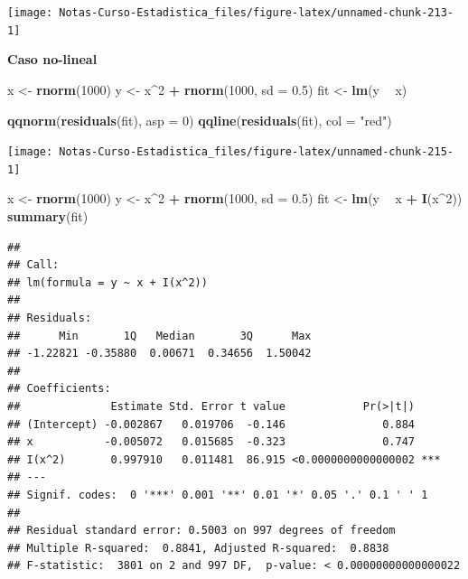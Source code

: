 \documentclass[
  12pt,
]{book}
\newenvironment{Shaded}{\begin{snugshade}}{\end{snugshade}}
\newcommand{\DataTypeTok}[1]{\textcolor[rgb]{0.13,0.29,0.53}{#1}}
\newcommand{\DecValTok}[1]{\textcolor[rgb]{0.00,0.00,0.81}{#1}}
\newcommand{\FloatTok}[1]{\textcolor[rgb]{0.00,0.00,0.81}{#1}}
\newcommand{\KeywordTok}[1]{\textcolor[rgb]{0.13,0.29,0.53}{\textbf{#1}}}
\newcommand{\NormalTok}[1]{#1}
\newcommand{\OperatorTok}[1]{\textcolor[rgb]{0.81,0.36,0.00}{\textbf{#1}}}
\newcommand{\StringTok}[1]{\textcolor[rgb]{0.31,0.60,0.02}{#1}}
\theoremstyle{definition}
\theoremstyle{definition}
\theoremstyle{definition}
\theoremstyle{remark}
\begin{document}
\begin{center}\texttt{[image: Notas-Curso-Estadistica\_files/figure-latex/unnamed-chunk-213-1]} \end{center}

\textbf{Caso no-lineal}

\begin{Shaded}
\begin{Highlighting}[]
\NormalTok{x <-}\StringTok{ }\KeywordTok{rnorm}\NormalTok{(}\DecValTok{1000}\NormalTok{)}
\NormalTok{y <-}\StringTok{ }\NormalTok{x}\OperatorTok{^}\DecValTok{2} \OperatorTok{+}\StringTok{ }\KeywordTok{rnorm}\NormalTok{(}\DecValTok{1000}\NormalTok{, }\DataTypeTok{sd =} \FloatTok{0.5}\NormalTok{)}
\NormalTok{fit <-}\StringTok{ }\KeywordTok{lm}\NormalTok{(y }\OperatorTok{~}\StringTok{ }\NormalTok{x)}
\end{Highlighting}
\end{Shaded}

\begin{Shaded}
\begin{Highlighting}[]
\KeywordTok{qqnorm}\NormalTok{(}\KeywordTok{residuals}\NormalTok{(fit), }\DataTypeTok{asp =} \DecValTok{0}\NormalTok{)}
\KeywordTok{qqline}\NormalTok{(}\KeywordTok{residuals}\NormalTok{(fit), }\DataTypeTok{col =} \StringTok{"red"}\NormalTok{)}
\end{Highlighting}
\end{Shaded}

\begin{center}\texttt{[image: Notas-Curso-Estadistica\_files/figure-latex/unnamed-chunk-215-1]} \end{center}

\begin{Shaded}
\begin{Highlighting}[]
\NormalTok{x <-}\StringTok{ }\KeywordTok{rnorm}\NormalTok{(}\DecValTok{1000}\NormalTok{)}
\NormalTok{y <-}\StringTok{ }\NormalTok{x}\OperatorTok{^}\DecValTok{2} \OperatorTok{+}\StringTok{ }\KeywordTok{rnorm}\NormalTok{(}\DecValTok{1000}\NormalTok{, }\DataTypeTok{sd =} \FloatTok{0.5}\NormalTok{)}
\NormalTok{fit <-}\StringTok{ }\KeywordTok{lm}\NormalTok{(y }\OperatorTok{~}\StringTok{ }\NormalTok{x }\OperatorTok{+}\StringTok{ }\KeywordTok{I}\NormalTok{(x}\OperatorTok{^}\DecValTok{2}\NormalTok{))}
\KeywordTok{summary}\NormalTok{(fit)}
\end{Highlighting}
\end{Shaded}

\begin{verbatim}
## 
## Call:
## lm(formula = y ~ x + I(x^2))
## 
## Residuals:
##      Min       1Q   Median       3Q      Max 
## -1.22821 -0.35880  0.00671  0.34656  1.50042 
## 
## Coefficients:
##              Estimate Std. Error t value            Pr(>|t|)    
## (Intercept) -0.002867   0.019706  -0.146               0.884    
## x           -0.005072   0.015685  -0.323               0.747    
## I(x^2)       0.997910   0.011481  86.915 <0.0000000000000002 ***
## ---
## Signif. codes:  0 '***' 0.001 '**' 0.01 '*' 0.05 '.' 0.1 ' ' 1
## 
## Residual standard error: 0.5003 on 997 degrees of freedom
## Multiple R-squared:  0.8841, Adjusted R-squared:  0.8838 
## F-statistic:  3801 on 2 and 997 DF,  p-value: < 0.00000000000000022
\end{verbatim}
\end{document}

